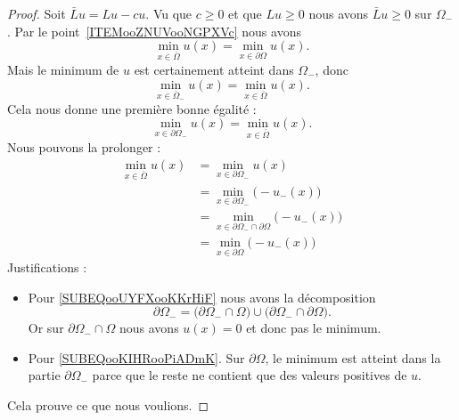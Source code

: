 \begin{proof}
    Soit \( \bar Lu=Lu-cu\). Vu que \( c\geq 0\) et que \( Lu\geq 0\) nous avons \( \bar Lu\geq 0\) sur \( \Omega_-\). Par le point~\ref{ITEMooZNUVooNGPXVc} nous avons
    \begin{equation}
        \min_{x\in \bar \Omega}u(x)=\min_{x\in\partial\Omega}u(x).
    \end{equation}
    Mais le minimum de \( u\) est certainement atteint dans \( \Omega_-\), donc
    \begin{equation}
        \min_{x\in\bar\Omega_-}u(x)=\min_{x\in\bar\Omega}u(x).
    \end{equation}
    Cela nous donne une première bonne égalité :
    \begin{equation}
        \min_{x\in\partial\Omega_-}u(x)=\min_{x\in\bar \Omega}u(x).
    \end{equation}
    Nous pouvons la prolonger :
    \begin{subequations}
        \begin{align}
            \min_{x\in\bar\Omega}u(x)&=\min_{x\in \partial\Omega_-}u(x)\\
            &=\min_{x\in\partial\Omega_-}\big( -u_-(x) \big)\\
            &=\min_{x\in\partial\Omega_-\cap\partial\Omega}\big( -u_-(x) \big)  \label{SUBEQooUYFXooKKrHiF}\\
            &=\min_{x\in\partial\Omega}\big( -u_-(x) \big)          \label{SUBEQooKIHRooPiADmK}
        \end{align}
    \end{subequations}
    Justifications :
    \begin{itemize}
        \item Pour \eqref{SUBEQooUYFXooKKrHiF} nous avons la décomposition
            \begin{equation}
                \partial \Omega_-=\big( \partial\Omega_-\cap\Omega \big)\cup\big( \partial\Omega_-\cap\partial \Omega \big).
            \end{equation}
            Or sur \( \partial\Omega_-\cap\Omega\) nous avons \( u(x)=0\) et donc pas le minimum.
        \item Pour \eqref{SUBEQooKIHRooPiADmK}. Sur \( \partial\Omega\), le minimum est atteint dans la partie \( \partial\Omega_-\) parce que le reste ne contient que des valeurs positives de \( u\).
    \end{itemize}

    Cela prouve ce que nous voulions.
\end{proof}

